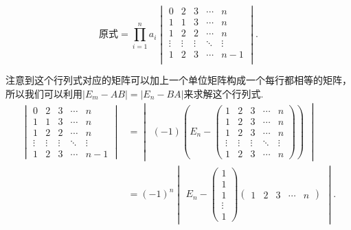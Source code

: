 \begin{enumerate}
        \begin{solution}
            \[ \text{原式}=\prod_{i=1}^na_i \begin{vmatrix}
                0      & 2      & 3      & \cdots & n      \\
                1      & 1      & 3      & \cdots & n      \\
                1      & 2      & 2      & \cdots & n      \\
                \vdots & \vdots & \vdots & \ddots & \vdots \\
                1      & 2      & 3      & \cdots & n-1    \\
            \end{vmatrix}. \]

            注意到这个行列式对应的矩阵可以加上一个单位矩阵构成一个每行都相等的矩阵，所以我们可以利用$|E_m-AB|=|E_n-BA|$来求解这个行列式.
            \begin{align*}
                \begin{vmatrix}
                    0      & 2      & 3      & \cdots & n      \\
                    1      & 1      & 3      & \cdots & n      \\
                    1      & 2      & 2      & \cdots & n      \\
                    \vdots & \vdots & \vdots & \ddots & \vdots \\
                    1      & 2      & 3      & \cdots & n-1
                \end{vmatrix}
                & = \begin{vmatrix}(-1)\left(E_n-\begin{pmatrix}
                        1      & 2      & 3      & \cdots & n      \\
                        1      & 2      & 3      & \cdots & n      \\
                        1      & 2      & 3      & \cdots & n      \\
                        \vdots & \vdots & \vdots & \ddots & \vdots \\
                        1      & 2      & 3      & \cdots & n
                    \end{pmatrix}\right)\end{vmatrix} \\
                & =(-1)^n\begin{vmatrix}E_n-
                            \begin{pmatrix}
                        1 \\1\\1\\\vdots\\1
                    \end{pmatrix}\begin{pmatrix}1 & 2 & 3 & \cdots & n\end{pmatrix}\end{vmatrix}.
            \end{align*}


\end{solution}
\end{enumerate}
